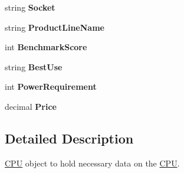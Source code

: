 \begin{DoxyCompactItemize}
\item 
string {\bfseries Socket}\hypertarget{class_business_objects_1_1_c_p_u_a183b5db42a6e13f85502bc1c1b5eb400}{}\label{class_business_objects_1_1_c_p_u_a183b5db42a6e13f85502bc1c1b5eb400}

\item 
string {\bfseries Product\+Line\+Name}\hypertarget{class_business_objects_1_1_c_p_u_a662d917f4e92682ed35625440e339ae9}{}\label{class_business_objects_1_1_c_p_u_a662d917f4e92682ed35625440e339ae9}

\item 
int {\bfseries Benchmark\+Score}\hypertarget{class_business_objects_1_1_c_p_u_a6e97a16652352aee41163bb01b3bf205}{}\label{class_business_objects_1_1_c_p_u_a6e97a16652352aee41163bb01b3bf205}

\item 
string {\bfseries Best\+Use}\hypertarget{class_business_objects_1_1_c_p_u_a17391b50d5f3e059feccfa16d8535388}{}\label{class_business_objects_1_1_c_p_u_a17391b50d5f3e059feccfa16d8535388}

\item 
int {\bfseries Power\+Requirement}\hypertarget{class_business_objects_1_1_c_p_u_acca2b421cc92cd56df0545c193f6724c}{}\label{class_business_objects_1_1_c_p_u_acca2b421cc92cd56df0545c193f6724c}

\item 
decimal {\bfseries Price}\hypertarget{class_business_objects_1_1_c_p_u_ac7f66e5df1a12f80d76f06fd969dc35e}{}\label{class_business_objects_1_1_c_p_u_ac7f66e5df1a12f80d76f06fd969dc35e}

\end{DoxyCompactItemize}


\subsection{Detailed Description}
\hyperlink{class_business_objects_1_1_c_p_u}{C\+PU} object to hold necessary data on the \hyperlink{class_business_objects_1_1_c_p_u}{C\+PU}. 



